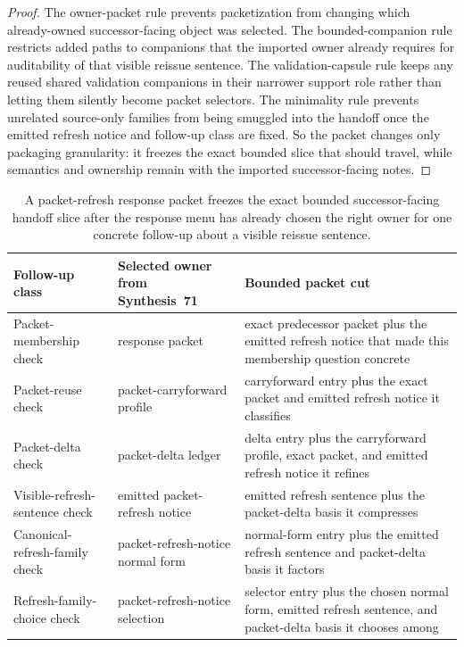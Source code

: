 \documentclass[11pt]{article}
\begin{document}
\begin{proof}
The owner-packet rule prevents packetization from changing which already-owned successor-facing object was selected.
The bounded-companion rule restricts added paths to companions that the imported owner already requires for auditability of that visible reissue sentence.
The validation-capsule rule keeps any reused shared validation companions in their narrower support role rather than letting them silently become packet selectors.
The minimality rule prevents unrelated source-only families from being smuggled into the handoff once the emitted refresh notice and follow-up class are fixed.
So the packet changes only packaging granularity: it freezes the exact bounded slice that should travel, while semantics and ownership remain with the imported successor-facing notes.\qedhere
\end{proof}

\begin{table}[t]
\centering
\small
\begin{tabularx}{\linewidth}{@{}l l X@{}}
\toprule
Follow-up class & Selected owner from Synthesis~71 & Bounded packet cut \\
\midrule
Packet-membership check & response packet & exact predecessor packet plus the emitted refresh notice that made this membership question concrete \\
Packet-reuse check & packet-carryforward profile & carryforward entry plus the exact packet and emitted refresh notice it classifies \\
Packet-delta check & packet-delta ledger & delta entry plus the carryforward profile, exact packet, and emitted refresh notice it refines \\
Visible-refresh-sentence check & emitted packet-refresh notice & emitted refresh sentence plus the packet-delta basis it compresses \\
Canonical-refresh-family check & packet-refresh-notice normal form & normal-form entry plus the emitted refresh sentence and packet-delta basis it factors \\
Refresh-family-choice check & packet-refresh-notice selection & selector entry plus the chosen normal form, emitted refresh sentence, and packet-delta basis it chooses among \\
\bottomrule
\end{tabularx}
\caption{A packet-refresh response packet freezes the exact bounded successor-facing handoff slice after the response menu has already chosen the right owner for one concrete follow-up about a visible reissue sentence.}
\label{tab:publicrequestresponsepacketrefreshresponsepacket}
\end{table}
\end{document}
